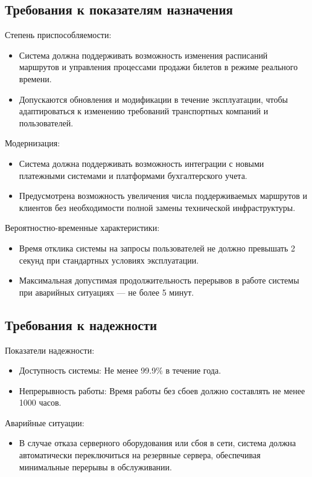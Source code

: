 \subsection{Требования к показателям назначения}

\noindent Степень приспособляемости:
\begin{itemize}
    \item Система должна поддерживать возможность изменения расписаний маршрутов
    и управления процессами продажи билетов в режиме реального времени.
    \item Допускаются обновления и модификации в течение эксплуатации, чтобы
    адаптироваться к изменению требований транспортных компаний и пользователей.
\end{itemize}

\noindent Модернизация:
\begin{itemize}
    \item Система должна поддерживать возможность интеграции с новыми платежными
    системами и платформами бухгалтерского учета.
    \item Предусмотрена возможность увеличения числа поддерживаемых маршрутов и клиентов
    без необходимости полной замены технической инфраструктуры.
\end{itemize}

\noindent Вероятностно-временные характеристики:
\begin{itemize}
    \item Время отклика системы на запросы пользователей не должно превышать 2
    секунд при стандартных условиях эксплуатации.
    \item Максимальная допустимая продолжительность перерывов в работе системы
    при аварийных ситуациях — не более 5 минут.
\end{itemize}

\subsection{Требования к надежности}

\noindent Показатели надежности:
\begin{itemize}
    \item Доступность системы: Не менее 99.9\% в течение года.
    \item Непрерывность работы: Время работы без сбоев должно составлять не
    менее 1000 часов.
\end{itemize}

\noindent Аварийные ситуации:
\begin{itemize}
    \item В случае отказа серверного оборудования или сбоя в сети, система
    должна автоматически переключиться на резервные сервера, обеспечивая
    минимальные перерывы в обслуживании.
\end{itemize}

